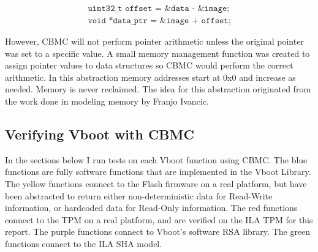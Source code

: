 \documentclass[../report.tex]{subfiles}
\def\code#1{\texttt{#1}}
\begin{document}
\begin{equation} \label{eq:ptr}
\begin{split}
    \code{uint32\_t offset = \&data - \&image;} \\
    \code{void *data\_ptr = \&image + offset;} 
\end{split}
\end{equation}

However, CBMC will not perform pointer arithmetic unless the original pointer
was set to a specific value.
A small memory management function was created to assign pointer values to data
structures so CBMC would perform the correct arithmetic.
In this abstraction memory addresses start at 0x0 and increase as needed.
Memory is never reclaimed.
The idea for this abstraction originated from the work done in modeling memory
by Franjo Ivancic\cite{eff-model-check}.

% 

\subsection{Verifying Vboot with CBMC}

In the sections below I run tests on each Vboot function using CBMC\@.
The blue functions are fully software functions that are implemented in the Vboot Library.
The yellow functions connect to the Flash firmware on a real platform, but have been abstracted to return either non-deterministic data for Read-Write information, or hardcoded data for Read-Only information.
The red functions connect to the TPM on a real platform, and are verified on the
ILA TPM for this report.
The purple functions connect to Vboot's software RSA library. 
The green functions connect to the ILA SHA model. 
\end{document}
